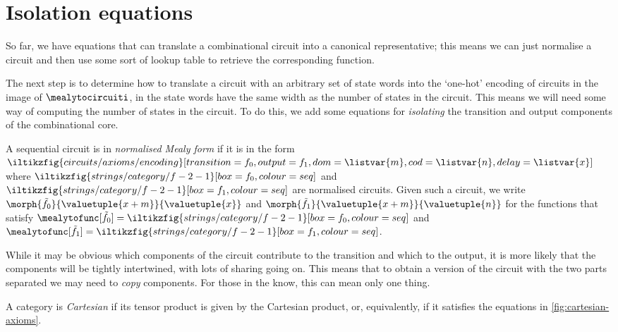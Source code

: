 \section{Isolation equations}

So far, we have equations that can translate a combinational circuit into a
canonical representative; this means we can just normalise a circuit and then
use some sort of lookup table to retrieve the corresponding function.

The next step is to determine how to translate a circuit with an arbitrary
set of state words into the `one-hot' encoding of circuits in the image of
\(\mealytocircuiti\), in the state words have the same width as the number of
states in the circuit.
This means we will need some way of computing the number of states in the
circuit.
To do this, we add some equations for \emph{isolating} the transition and output
components of the combinational core.

\begin{definition}
    A sequential circuit is in \emph{normalised Mealy form} if it is in the form
    \(
        \iltikzfig{circuits/axioms/encoding}[transition={f_0},output={f_1},dom=\listvar{m},cod=\listvar{n},delay=\listvar{x}]
    \) where \(
        \iltikzfig{strings/category/f-2-1}[box=f_0,colour=seq]
    \) and \(
        \iltikzfig{strings/category/f-2-1}[box=f_1,colour=seq]
    \) are normalised circuits.
    Given such a circuit, we write \(
        \morph{\tilde{f}_{0}}{\valuetuple{x+m}}{{\valuetuple{x}}}
    \) and \(
        \morph{\tilde{f}_{1}}{\valuetuple{x+m}}{{\valuetuple{n}}}
    \) for the functions that satisfy \(
        \mealytofunc[\tilde{f}_{0}] = \iltikzfig{strings/category/f-2-1}[box=f_0,colour=seq]
    \) and \(
        \mealytofunc[\tilde{f}_{1}] = \iltikzfig{strings/category/f-2-1}[box=f_1,colour=seq]
    \).
\end{definition}

While it may be obvious which components of the circuit contribute to the
transition and which to the output, it is more likely that the components will
be tightly intertwined, with lots of sharing going on.
This means that to obtain a version of the circuit with the two parts separated
we may need to \emph{copy} components.
For those in the know, this can mean only one thing.

\begin{definition}
    A category is \emph{Cartesian} if its tensor product is given by the Cartesian
    product, or, equivalently, if it satisfies the equations in
    \cref{fig:cartesian-axioms}.
\end{definition}

